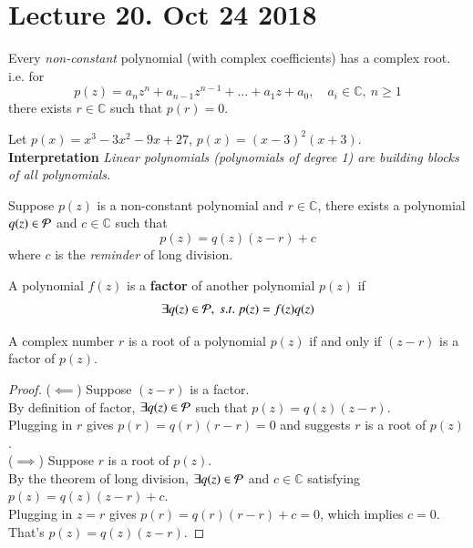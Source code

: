 \documentclass[11pt]{article}
\begin{document}
	\section{Lecture 20. Oct 24 2018}
	\begin{theorem}
		Every \emph{non-constant} polynomial (with complex coefficients) has a complex root.
		i.e. for 
		\[
			p(z) = a_n z^n + a_{n-1} z^{n-1} + \dots + a_1 z + a_0,\quad a_i \in \mathbb{C},\ n\geq 1
		\]
		there exists $r \in \mathbb{C}$ such that $p(r) = 0$.
	\end{theorem}
	\begin{example}
		Let $p(x) = x^3 -3x^2 - 9x + 27$, $p(x) = (x-3)^2 (x+3)$. \\
		\textbf{Interpretation} \emph{Linear polynomials (polynomials of degree 1) are building blocks of all polynomials.}
	\end{example}
	
	\begin{theorem}
		Suppose $p(z)$ is a non-constant polynomial and $r \in \mathbb{C}$, there exists a polynomial $q(z) \in \mathcal{{P}}$ and $c \in \mathbb{C}$ such that
		\[
			p(z) = q(z)(z-r) + c
		\]
		where $c$ is the \emph{reminder} of long division.
	\end{theorem}
	
	\begin{definition}
		A polynomial $f(z)$ is a \textbf{factor} of another polynomial $p(z)$ if 
		\[
			\exists q(z) \in \mathcal{{P}},\ s.t.\ p(z) = f(z)q(z)
		\]
	\end{definition}
	
	\begin{theorem}
		A complex number $r$ is a root of a polynomial $p(z)$ if and only if $(z-r)$ is a factor of $p(z)$.
	\end{theorem}
	\begin{proof}
		($\impliedby$) Suppose $(z-r)$ is a factor. \\
		By definition of factor, $\exists q(z) \in \mathcal{{P}}$ such that $p(z) = q(z)(z-r)$. \\
		Plugging in $r$ gives $p(r) = q(r)(r-r) = 0$ and suggests $r$ is a root of $p(z)$. \\
		($\implies$) Suppose $r$ is a root of $p(z)$. \\
		By the theorem of long division, $\exists q(z) \in \mathcal{{P}}$ and $c \in \mathbb{C}$ satisfying \\
		$p(z) = q(z)(z-r) + c$. \\
		Plugging in $z=r$ gives $p(r) = q(r)(r-r) + c = 0$, which implies $c=0$. \\
		That's $p(z) = q(z)(z-r)$.
	\end{proof}
	
\end{document}
